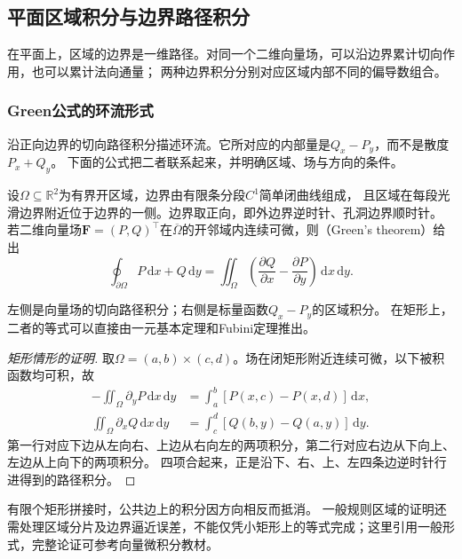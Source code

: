 \subsection{平面区域积分与边界路径积分}

在平面上，区域的边界是一维路径。对同一个二维向量场，可以沿边界累计切向作用，也可以累计法向通量；
两种边界积分分别对应区域内部不同的偏导数组合。

\subsubsection{Green公式的环流形式}

沿正向边界的切向路径积分描述环流。它所对应的内部量是$Q_x-P_y$，而不是散度$P_x+Q_y$。
下面的公式把二者联系起来，并明确区域、场与方向的条件。
\begin{theorem}[Green公式]
\label{thm:multivariable-green}
设$\Omega\subseteq\mathbb R^2$为有界开区域，边界由有限条分段$C^1$简单闭曲线组成，
且区域在每段光滑边界附近位于边界的一侧。边界取正向，即外边界逆时针、孔洞边界顺时针。
若二维向量场$\bm F=(P,Q)^\top$在$\overline\Omega$的开邻域内连续可微，则（Green's theorem）给出
\begin{equation}
 \oint_{\partial\Omega}P\,\mathrm dx+Q\,\mathrm dy
 =\iint_\Omega\left(\frac{\partial Q}{\partial x}-\frac{\partial P}{\partial y}\right)\,\mathrm dx\,\mathrm dy.
 \label{eq:multivariable-green}
\end{equation}
\end{theorem}
左侧是向量场的切向路径积分；右侧是标量函数$Q_x-P_y$的区域积分。
在矩形上，二者的等式可以直接由一元基本定理和Fubini定理推出。
\begin{proof}[矩形情形的证明]
取$\Omega=(a,b)\times(c,d)$。场在闭矩形附近连续可微，以下被积函数均可积，故
\[
 \begin{aligned}
 -\iint_\Omega\partial_yP\,\mathrm dx\,\mathrm dy
 &=\int_a^b[P(x,c)-P(x,d)]\,\mathrm dx,\\
 \iint_\Omega\partial_xQ\,\mathrm dx\,\mathrm dy
 &=\int_c^d[Q(b,y)-Q(a,y)]\,\mathrm dy.
 \end{aligned}
\]
第一行对应下边从左向右、上边从右向左的两项积分，第二行对应右边从下向上、左边从上向下的两项积分。
四项合起来，正是沿下、右、上、左四条边逆时针行进得到的路径积分。
\end{proof}
有限个矩形拼接时，公共边上的积分因方向相反而抵消。
一般规则区域的证明还需处理区域分片及边界逼近误差，不能仅凭小矩形上的等式完成；这里引用一般形式，完整论证可参考向量微积分教材。

